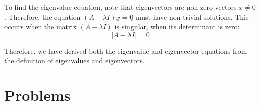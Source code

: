 To find the eigenvalue equation, note that eigenvectors are non-zero vectors $\underline{x} \neq \underline{0}$. Therefore, the equation $(A - \lambda I) \underline{x} = \underline{0}$ must have non-trivial solutions. This occurs when the matrix $(A - \lambda I)$ is singular, when its determinant is zero:
$$|A - \lambda I| = 0$$

Therefore, we have derived both the eigenvalue and eigenvector equations from the definition of eigenvalues and eigenvectors.

\section{Problems}